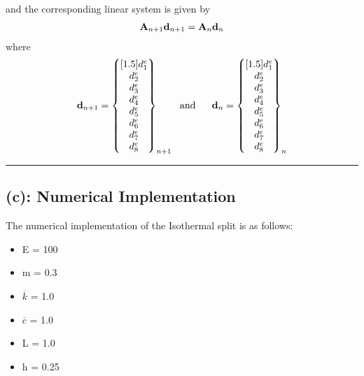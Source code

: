 and the corresponding linear system is given by 
\begin{align*}
{\bf A}_{n+1}{\bf d}_{n+1}
=
{\bf A}_{n}{\bf d}_n
\end{align*}
where 
\begin{align*}
{\bf d}_{n+1}
=
\begin{Bmatrix}[1.5]
d^e_1\\d^e_2\\d^e_3\\d^e_4\\d^e_5\\d^e_6\\d^e_7\\d^e_8
\end{Bmatrix}_{n+1} \ \ \text{and} \ \ \ \ \ 
{\bf d}_{n}
=
\begin{Bmatrix}[1.5]
d^e_1\\d^e_2\\d^e_3\\d^e_4\\d^e_5\\d^e_6\\d^e_7\\d^e_8
\end{Bmatrix}_{n}
\end{align*}\hrule\newpage
\subsection*{(c): Numerical Implementation}
The numerical implementation of the Isothermal split is as follows:
\begin{itemize}
\item E = 100
\item m = 0.3 
\item $\overline{k}$ = 1.0
\item $\overline{c}$ = 1.0
\item L = 1.0
\item h = 0.25
\end{itemize}
